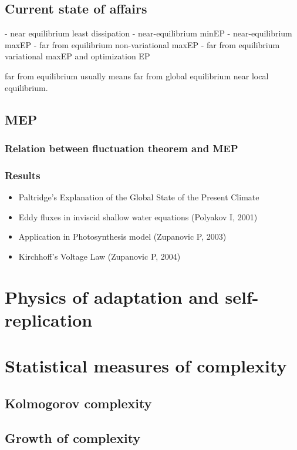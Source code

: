 \documentclass[a4paper,12pt,nofootinbib]{article}
\begin{document}
\subsection{Current state of affairs}

- near equilibrium least dissipation
- near-equilibrium minEP
- near-equilibrium maxEP
- far from equilibrium non-variational maxEP
- far from equilibrium variational maxEP and optimization EP

far from equilibrium usually means far from global equilibrium near local equilibrium.

\subsection{MEP}
\subsubsection{Relation between fluctuation theorem and MEP}
\subsubsection{Results}
\begin{itemize}
	\item Paltridge's Explanation of the Global State of the Present Climate
	\item Eddy fluxes in inviscid shallow water equations (Polyakov I, 2001)
	\item Application in Photosynthesis model (Zupanovic P, 2003)
	\item Kirchhoff's Voltage Law (Zupanovic P, 2004)
\end{itemize}



\section{Physics of adaptation and self-replication}

\section{Statistical measures of complexity}
\subsection{Kolmogorov complexity}

\subsection{Growth of complexity}
\end{document}
